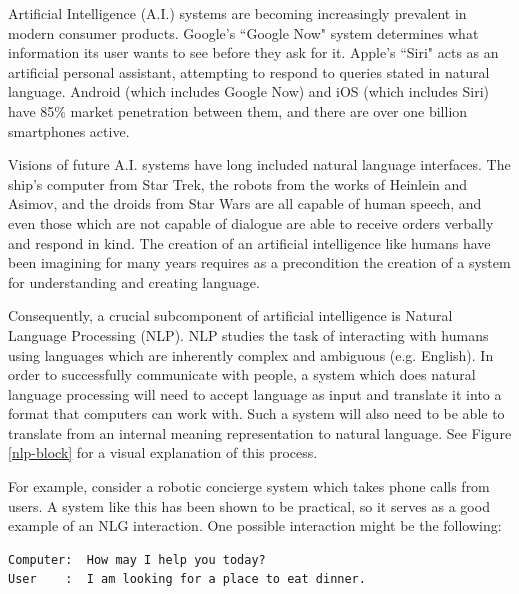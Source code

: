 Artificial Intelligence (A.I.) systems are becoming increasingly prevalent in
modern consumer products.  Google's ``Google Now" system determines
what information its user wants to see before they ask for it.  Apple's ``Siri"
acts as an artificial personal assistant, attempting to respond to queries stated in
natural language.  Android (which includes Google Now) and iOS (which
includes Siri) have 85\% market penetration between them, and there are
over one billion smartphones active.

Visions of future A.I. systems have long included natural
language interfaces.  The ship's computer from Star Trek, the robots from
the works of Heinlein and Asimov, and the droids from Star Wars are
all capable of human speech, and even those which are not capable of dialogue
are able to receive orders verbally and respond in kind.  The creation
of an artificial intelligence like humans have been imagining for many years
requires as a precondition the creation of a system for understanding and
creating language.

Consequently, a crucial subcomponent of artificial intelligence is Natural Language Processing (NLP).
NLP studies the task of interacting with humans using languages which are inherently
complex and ambiguous (e.g. English).
In order to successfully communicate with people, a system which does natural
language processing will need to accept language as input
and translate it into a format that computers can work with.  Such a system will also
need to be able to translate from an internal meaning representation to natural language.
See Figure \ref{nlp-block} for a visual explanation of this process.

For example, consider a robotic concierge system which takes phone calls from users.
A system like this has been shown to be practical\cite{litman_njfun_2000}, so it serves
as a good example of an NLG interaction.  One possible interaction might be the following:

\begin{verbatim}
Computer:  How may I help you today?
User    :  I am looking for a place to eat dinner.
\end{verbatim}

